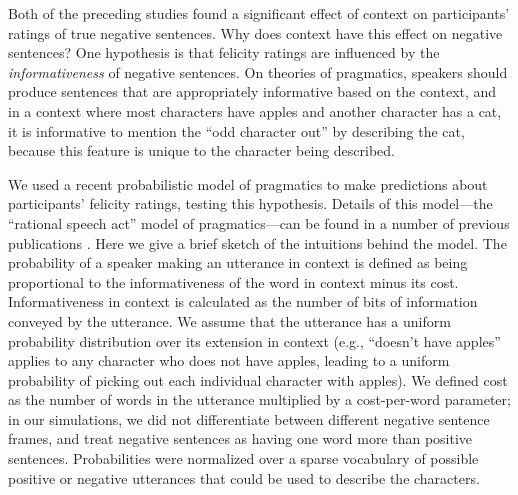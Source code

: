 \documentclass[10pt,letterpaper]{article}
\begin{document}
Both of the preceding studies found a significant effect of context on participants' ratings of true negative sentences.  Why does context have this effect on negative sentences?  One hypothesis is that felicity ratings are influenced by the \emph{informativeness} of negative sentences. On theories of pragmatics, speakers should produce sentences that are appropriately informative based on the context, and in a context where most characters have apples and another character has a cat, it is informative to mention the ``odd character out'' by describing the cat, because this feature is unique to the character being described.




We used a recent probabilistic model of pragmatics to make predictions about participants' felicity ratings, testing this hypothesis. Details of this model---the ``rational speech act'' model of pragmatics---can be found in a number of previous publications \cite{frank2012,goodman2013,nordmeyer2014}. Here we give a brief sketch of the intuitions behind the model. The probability of a speaker making an utterance in context is defined as being  proportional to the informativeness of the word in context minus its cost.  Informativeness in context is calculated as the number of bits of information conveyed by the utterance.  We assume that the utterance has a uniform probability distribution over its extension in context (e.g., ``doesn't have apples'' applies to any character who does not have apples, leading to a uniform probability of picking out each individual character with apples). We defined cost as the number of words in the utterance multiplied by a cost-per-word parameter; in our simulations, we did not differentiate between different negative sentence frames, and treat negative sentences as having one word more than positive sentences.  Probabilities were normalized over a sparse vocabulary of possible positive or negative utterances that could be used to describe the characters.
\end{document}
